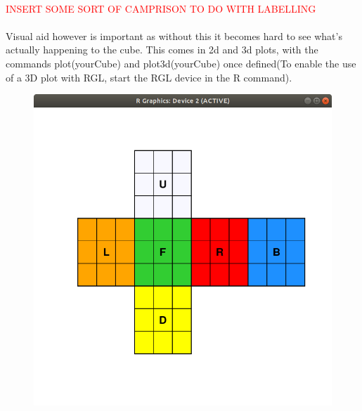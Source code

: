 \documentclass{article}
\begin{document}
\paragraph*{}
\textcolor{red}{INSERT SOME SORT OF CAMPRISON TO DO WITH LABELLING}
\paragraph*{}
Visual aid however is important as without this it becomes hard to see what's actually happening to the cube. This comes in 2d and 3d plots, with the commands plot(yourCube) and plot3d(yourCube) once defined(To enable the use of a 3D plot with RGL, start the RGL device in the R command).

\begin{figure}[h]
	\centering
	\includegraphics[scale=.4]{2dcube.png}

\end{figure}
\end{document}
